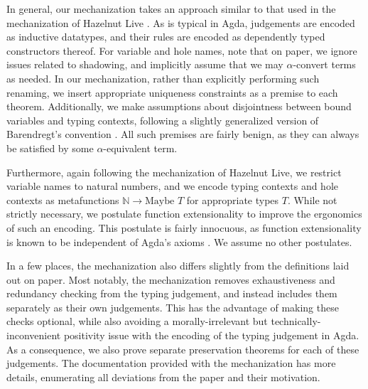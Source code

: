 In general, our mechanization takes an approach similar to that used in the mechanization of Hazelnut Live \cite{DBLP:journals/pacmpl/OmarVCH19}. As is typical in Agda, judgements are encoded as inductive datatypes, and their rules are encoded as dependently typed constructors thereof. For variable and hole names, note that on paper, we ignore issues related to shadowing, and implicitly assume that we may $\alpha$-convert terms as needed. In our mechanization, rather than explicitly performing such renaming, we insert appropriate uniqueness constraints as a premise to each theorem. Additionally, we make assumptions about disjointness between bound variables and typing contexts, following a slightly generalized version of Barendregt’s convention \cite{DBLP:books/daglib/0067558, DBLP:conf/cade/UrbanBN07}. All such premises are fairly benign, as they can always be satisfied by some $\alpha$-equivalent term.

Furthermore, again following the mechanization of Hazelnut Live, we restrict variable names to natural numbers, and we encode typing contexts and hole contexts as metafunctions $\mathbb{N} \to \text{Maybe } T$ for appropriate types $T$. While not strictly necessary, we postulate function extensionality to improve the ergonomics of such an encoding. This postulate is fairly innocuous, as function extensionality is known to be independent of Agda’s axioms \cite{DBLP:conf/lics/AwodeyGS12}. We assume no other postulates.

In a few places, the mechanization also differs slightly from the definitions laid out on paper. Most notably, the mechanization removes exhaustiveness and redundancy checking from the typing judgement, and instead includes them separately as their own judgements. This has the advantage of making these checks optional, while also avoiding a morally-irrelevant but technically-inconvenient positivity issue with the encoding of the typing judgement in Agda. As a consequence, we also prove separate preservation theorems for each of these judgements. The documentation provided with the mechanization has more details, enumerating all deviations from the paper and their motivation.
